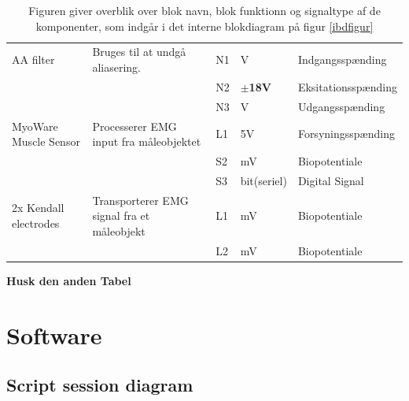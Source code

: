 \begin{table} [H]
  \centering

\begin{tabular}  {|p{3cm}|p{4cm}|p{1cm}|p{1.5cm}|p{3.8cm}| }

\hline

AA filter & Bruges til at undgå aliasering.  &  N1 & V & Indgangsspænding  \\ \cline{3-5}
	 &  & N2 & $ \pm  $\textbf{18V}& Eksitationsspænding \\ \cline{3-5} 
	 &  & N3 & V & Udgangsspænding \\ \cline{3-5} \hline
	 

MyoWare Muscle Sensor & Processerer EMG input fra måleobjektet &  L1 & 5V & Forsyningsspænding  \\ \cline{3-5}
	 &  & S2 & mV & Biopotentiale \\ \cline{3-5} 
	 &  & S3 & bit(seriel) & Digital Signal \\ \cline{3-5} \hline
	 
	 
2x Kendall electrodes & Transporterer EMG signal fra et måleobjekt  &  L1 & mV & Biopotentiale  \\ \cline{3-5}
	 &  & L2 & mV & Biopotentiale \\ \cline{3-5} \hline
	 

\end{tabular}
 \caption{Figuren giver overblik over blok navn, blok funktionn og signaltype af de komponenter, som indgår i det interne blokdiagram på figur \ref{ibdfigur}} \label{tab:Sigbeskriv.}
\end{table}

\textbf{Husk den anden Tabel}
\chapter{Software} \label{swafsnit}
\section{Script session diagram}

